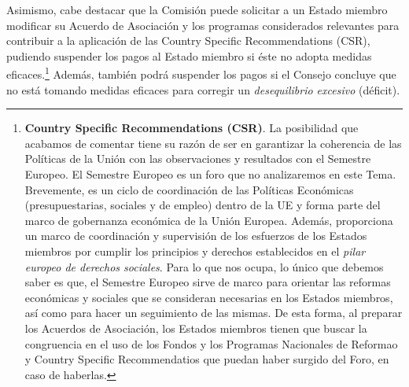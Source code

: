 \documentclass[10pt,a4paper]{article}
\begin{document}
Asimismo, cabe destacar que la Comisión puede solicitar a un Estado miembro modificar su Acuerdo de Asociación y los programas considerados relevantes para contribuir a la aplicación de las Country Specific Recommendations (CSR), pudiendo suspender los pagos al Estado miembro si éste no adopta medidas eficaces.\footnote{%
    \textbf{Country Specific Recommendations (CSR)}. La posibilidad que acabamos de comentar tiene su razón de ser en garantizar la coherencia de las Políticas de la Unión con las observaciones y resultados con el Semestre Europeo. El Semestre Europeo es un foro que no analizaremos en este Tema. Brevemente, es un ciclo de coordinación de las Políticas Económicas (presupuestarias, sociales y de empleo) dentro de la UE y forma parte del marco de gobernanza económica de la Unión Europea. Además, proporciona un marco de coordinación y supervisión de los esfuerzos de los Estados miembros por cumplir los principios y derechos establecidos en el \textit{pilar europeo de derechos sociales}. Para lo que nos ocupa, lo único que debemos saber es que, el Semestre Europeo sirve de marco para orientar las reformas económicas y sociales que se consideran necesarias en los Estados miembros, así como para hacer un seguimiento de las mismas. De esta forma, al preparar los Acuerdos de Asociación, los Estados miembros tienen que buscar la congruencia en el uso de los Fondos y los Programas Nacionales de Reformao y Country Specific Recommendatios que puedan haber surgido del Foro, en caso de haberlas.
} Además, también podrá suspender los pagos si el Consejo concluye que no está tomando medidas eficaces para corregir un \textit{desequilibrio excesivo} (déficit).
\end{document}
